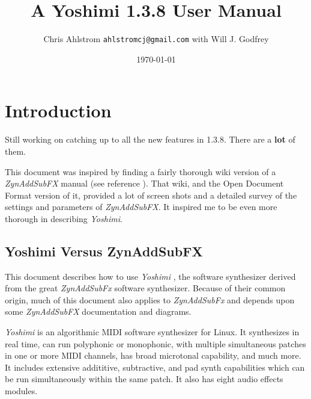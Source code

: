 \documentclass[
 11pt,
 twoside,
 a4paper,
 headinclude,
 footinclude,
 final                                 %
]{article}
\begin{document}
\title{A Yoshimi 1.3.8 User Manual}
\author{Chris Ahlstrom \texttt{ahlstromcj@gmail.com} with Will J. Godfrey}
\date{\today}
\maketitle
\tableofcontents
\listoffigures                         %
\listoftables                          %


\setlength{\parindent}{0pt}
\setlength{\parskip}{1ex plus 0.5ex minus 0.2ex}

\section{Introduction}
\label{sec:introduction}

   Still working on catching up to all the new features in 1.3.8.
   There are a \textbf{lot} of them.

   This document was inspired by finding a fairly thorough wiki version of a
   \textsl{ZynAddSubFX} manual (see reference \cite{zynwiki}).  That wiki,
   and the Open Document Format version of it, provided a lot of screen
   shots and a detailed survey of the settings and parameters of
   \textsl{ZynAddSubFX}.  It inspired me to be even more thorough in
   describing \textsl{Yoshimi}.

\subsection{Yoshimi Versus ZynAddSubFX}
\label{subsec:introduction_yoshimi_vs_zyn}

   This document describes how to use \textsl{Yoshimi} \cite{yoshimi},
   the software synthesizer derived from the great
   \textsl{ZynAddSubFx} \cite{zynaddsubfx} software
   synthesizer.  Because of their common origin, much of this document also
   applies to \textsl{ZynAddSubFx} and depends upon some \textsl{ZynAddSubFX}
   documentation and diagrams.

   \textsl{Yoshimi} is an algorithmic MIDI software synthesizer for Linux.
   It synthesizes in real time, can run polyphonic or monophonic, with multiple
   simultaneous patches in one or more MIDI channels, has broad microtonal
   capability, and much more. It includes extensive addititive, subtractive,
   and pad synth capabilities which can be run simultaneously within the
   same patch.  It also has eight audio effects modules.
\end{document}
